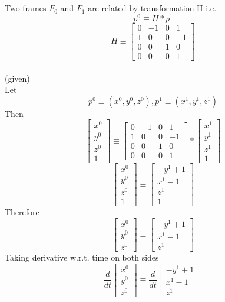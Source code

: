 \documentclass[12pt]{article}
\newcommand{\given}{{\\ \color{blue} \hspace*{\fill}(given)} \\}
\begin{document}
\section{}
Two frames $F_0$ and $F_1$ are related by transformation H i.e.
\[
  p^0 \equiv H * p^1
\]
\[
  H \equiv
  \begin{bmatrix} 0 & -1 & 0 & 1 \\ 1 & 0 & 0 & -1 \\ 0 & 0 & 1 & 0 \\ 0 & 0 & 0 & 1 \end{bmatrix}
\]
\given
Let
\[
  p^0 \equiv (x^0, y^0, z^0), p^1 \equiv (x^1, y^1, z^1)
\]
Then
\[
  \begin{bmatrix} x^0 \\ y^0 \\ z^0 \\ 1\end{bmatrix} \equiv
  \begin{bmatrix} 0 & -1 & 0 & 1 \\ 1 & 0 & 0 & -1 \\ 0 & 0 & 1 & 0 \\ 0 & 0 & 0 & 1 \end{bmatrix}
  *
  \begin{bmatrix} x^1 \\ y^1 \\ z^1 \\ 1\end{bmatrix}
\]
\[
  \begin{bmatrix} x^0 \\ y^0 \\ z^0 \\ 1\end{bmatrix} \equiv
  \begin{bmatrix} -y^1 + 1 \\ x^1 - 1 \\ z^1 \\ 1\end{bmatrix}
\]
Therefore
\[
  \begin{bmatrix} x^0 \\ y^0 \\ z^0\end{bmatrix} \equiv
  \begin{bmatrix} -y^1 + 1 \\ x^1 - 1 \\ z^1\end{bmatrix}
\]
Taking derivative w.r.t. time on both sides
\[
  \frac{d}{dt}\begin{bmatrix} x^0 \\ y^0 \\ z^0\end{bmatrix} \equiv
  \frac{d}{dt}\begin{bmatrix} -y^1 + 1 \\ x^1 - 1 \\ z^1\end{bmatrix}
\]
\end{document}
